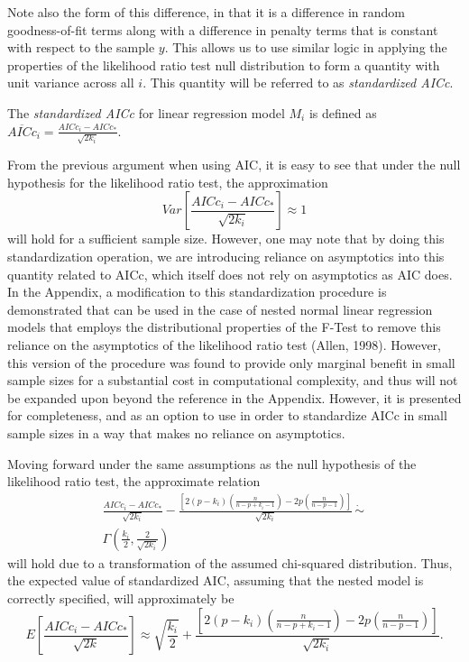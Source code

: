 		Note also the form of this difference, in that it is a difference in random goodness-of-fit terms along with a difference in penalty terms that is constant with respect to the
		sample $y$. This allows us to use similar logic in applying the properties of the likelihood ratio test null distribution to form a quantity with unit variance
		across all $i$. This quantity will be referred to as \textit{standardized AICc}.

		\begin{definition}
			The \textit{standardized AICc} for linear regression model $M_i$ is defined as $\overline{AICc}_i = \frac{AICc_i - AICc_*}{\sqrt{2k_i}}$.
		\end{definition}

		From the previous argument when using AIC, it is easy to see that under the null hypothesis for the likelihood ratio test, the approximation
		\begin{equation}
			Var \left[ \frac{AICc_i - AICc_*}{\sqrt{2k_i}} \right] \approx 1 
		\end{equation}
		will hold for a sufficient sample size. However, one may note that by doing this standardization operation, we are introducing reliance on asymptotics into this quantity
		related to AICc, which itself does not rely on asymptotics as AIC does. In the Appendix, a modification to this standardization procedure is demonstrated that can
		be used in the case of nested normal linear regression models that employs the distributional properties of the F-Test to remove this reliance on the asymptotics of the
		likelihood ratio test (Allen, 1998). However, this version of the procedure was found to provide only marginal benefit in small sample sizes for a substantial cost in
		computational complexity, and thus will not be expanded upon beyond the reference in the Appendix. However, it is presented for completeness, and as an option to use
		in order to standardize AICc in small sample sizes in a way that makes no reliance on asymptotics.
		
		Moving forward under the same assumptions as the null hypothesis of the likelihood ratio test, the approximate relation
		\begin{equation}
			\begin{split}
				\frac{AICc_i - AICc_*}{\sqrt{2k_i}} - \frac{\left[ 2(p-k_i) \left( \frac{n}{n-p+k_i-1} \right) - 2p \left( \frac{n}{n-p-1} \right) \right]}{\sqrt{2k_i}} \, \dot\sim \, \\ 
				\Gamma \left( \frac{k_i}{2}, \frac{2}{\sqrt{2k_i}} \right)
			\end{split}
		\end{equation}
		will hold due to a transformation of the assumed chi-squared distribution. Thus, the expected value of standardized AIC, assuming
		that the nested model is correctly specified, will approximately be
		\begin{equation}
			E \left[ \frac{AICc_i - AICc_*}{\sqrt{2k}} \right] \approx \sqrt{\frac{k_i}{2}} + \frac{\left[ 2(p-k_i) \left( \frac{n}{n-p+k_i-1} \right) - 2p \left( \frac{n}{n-p-1} \right) \right]}{\sqrt{2k_i}} .
		\end{equation}

